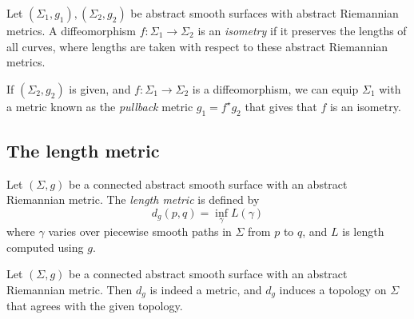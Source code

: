 \begin{definition}
	Let \( (\Sigma_1, g_1), (\Sigma_2, g_2) \) be abstract smooth surfaces with abstract Riemannian metrics.
	A diffeomorphism \( f \colon \Sigma_1 \to \Sigma_2 \) is an \textit{isometry} if it preserves the lengths of all curves, where lengths are taken with respect to these abstract Riemannian metrics.
\end{definition}
\begin{example}
	If \( (\Sigma_2, g_2) \) is given, and \( f \colon \Sigma_1 \to \Sigma_2 \) is a diffeomorphism, we can equip \( \Sigma_1 \) with a metric known as the \textit{pullback} metric \( g_1 = f^\star g_2 \) that gives that \( f \) is an isometry.
\end{example}

\subsection{The length metric}
\begin{definition}
	Let \( (\Sigma, g) \) be a connected abstract smooth surface with an abstract Riemannian metric.
	The \textit{length metric} is defined by
	\[ d_g(p,q) = \inf_\gamma L(\gamma) \]
	where \( \gamma \) varies over piecewise smooth paths in \( \Sigma \) from \( p \) to \( q \), and \( L \) is length computed using \( g \).
\end{definition}
\begin{proposition}
	Let \( (\Sigma, g) \) be a connected abstract smooth surface with an abstract Riemannian metric.
	Then \( d_g \) is indeed a metric, and \( d_g \) induces a topology on \( \Sigma \) that agrees with the given topology.
\end{proposition}
